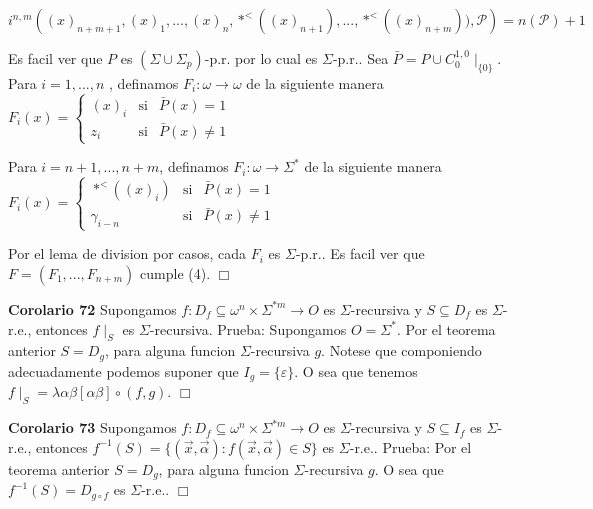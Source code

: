 \(\displaystyle i^{n,m}\left( (x)_{n+m+1},(x)_{1},...,(x)_{n},\ast ^{< }((x)_{n+1}),...,\ast ^{< }((x)_{n+m})),\mathcal{P}\right) =n(\mathcal{P})+1 \)

Es facil ver que \(P\) es \((\Sigma \cup \Sigma _{p})\)-p.r. por lo cual es \( \Sigma \)-p.r.. Sea \(\bar{P}=P\cup C_{0}^{1,0}\mid _{\{0\}}\). Para \(i=1,...,n\) , definamos \(F_{i}:\omega \rightarrow \omega \) de la siguiente manera
\(\displaystyle F_{i}(x)=\left\{ \begin{array}{ccc} (x)_{i} & \text{si} & \bar{P}(x)=1 \\ z_{i} & \text{si} & \bar{P}(x)\neq 1 \end{array} \right. \)

Para \(i=n+1,...,n+m\), definamos \(F_{i}:\omega \rightarrow \Sigma ^{\ast }\) de la siguiente manera
\(\displaystyle F_{i}(x)=\left\{ \begin{array}{lll} \ast ^{< }((x)_{i}) & \text{si} & \bar{P}(x)=1 \\ \gamma _{i-n} & \text{si} & \bar{P}(x)\neq 1 \end{array} \right. \)

Por el lema de division por casos, cada \(F_{i}\) es \(\Sigma \)-p.r.. Es facil ver que \(F=(F_{1},...,F_{n+m})\) cumple (4). \(\Box\)





\textbf{Corolario 72} Supongamos \(f:D_{f}\subseteq \omega ^{n}\times \Sigma ^{\ast m}\rightarrow O\) es \(\Sigma \)-recursiva y \(S\subseteq D_{f}\) es \( \Sigma \)-r.e., entonces \(f\mid _{S}\) es \(\Sigma \)-recursiva.
Prueba: Supongamos \(O=\Sigma ^{\ast }.\) Por el teorema anterior \(S=D_{g}\), para alguna funcion \(\Sigma \)-recursiva \(g.\) Notese que componiendo adecuadamente podemos suponer que \(I_{g}=\{\varepsilon \}.\) O sea que tenemos \(f\mid _{S}=\lambda \alpha \beta \left[ \alpha \beta \right] \circ (f,g)\). \(\Box\)





\textbf{Corolario 73} Supongamos \(f:D_{f}\subseteq \omega ^{n}\times \Sigma ^{\ast m}\rightarrow O\) es \(\Sigma \)-recursiva y \(S\subseteq I_{f}\) es \(\Sigma \)-r.e., entonces \( f^{-1}(S)=\{(\vec{x},\vec{\alpha}):f(\vec{x},\vec{\alpha})\in S\}\) es \( \Sigma \)-r.e..
Prueba: Por el teorema anterior \(S=D_{g}\), para alguna funcion \(\Sigma \)-recursiva \( g \). O sea que \(f^{-1}(S)=D_{g\circ f}\) es \(\Sigma \)-r.e.. \(\Box\)





